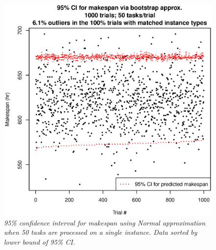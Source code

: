 \documentclass[12pt]{report}
\begin{document}
\begin{figure}
\includegraphics[width=1\textwidth]{validate-stochastic-runtimes-1000-trials-50-tasks.eps}
\caption{\textit{95\% confidence interval for makespan using Normal approximation when 50 tasks are processed on a single instance. Data sorted by lower bound of 95\% CI.}}
\label{fig:validate-stochastic-runtimes-1000-trials-50-tasks}
\end{figure}
\end{document}
